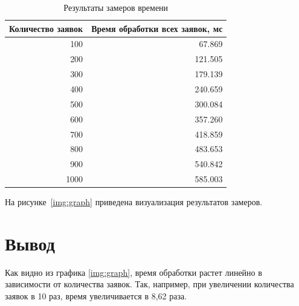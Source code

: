\begin{table}[H]
	\begin{center}
		\begin{threeparttable}
			\captionsetup{justification=raggedright, singlelinecheck=off}
			\caption{Результаты замеров времени}
			\label{tbl:time_mes}
			\begin{tabular}{|r|r|}
				\hline
				Количество заявок & Время обработки всех заявок, мс\\
				\hline
				100 & 67.869 \\ \hline
				200 & 121.505  \\ \hline
				300 & 179.139  \\ \hline
				400 & 240.659  \\ \hline
				500 & 300.084  \\ \hline
				600 & 357.260  \\ \hline
				700 & 418.859  \\ \hline
				800 & 483.653  \\ \hline
				900 & 540.842  \\ \hline
				1000 & 585.003  \\ \hline
			\end{tabular}
		\end{threeparttable}
	\end{center}
\end{table}


На рисунке~\ref{img:graph} приведена визуализация результатов замеров.


\section{Вывод}

Как видно из графика \ref{img:graph}, время обработки растет линейно в зависимости от количества заявок. Так, например, при увеличении количества заявок в 10 раз, время увеличивается в 8,62 раза.